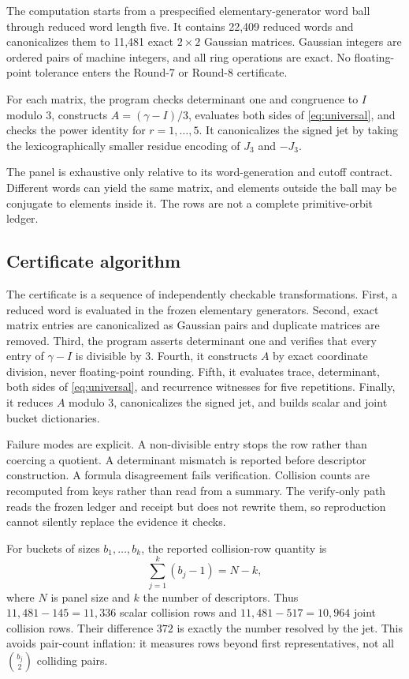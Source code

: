 \documentclass[11pt,a4paper]{article}
\theoremstyle{definition}
\theoremstyle{remark}
\begin{document}
The computation starts from a prespecified elementary-generator word ball through reduced word length five. It contains 22,409 reduced words and canonicalizes them to 11,481 exact \(2\times2\) Gaussian matrices. Gaussian integers are ordered pairs of machine integers, and all ring operations are exact. No floating-point tolerance enters the Round-7 or Round-8 certificate.

For each matrix, the program checks determinant one and congruence to \(I\) modulo \(3\), constructs \(A=(\gamma-I)/3\), evaluates both sides of \cref{eq:universal}, and checks the power identity for \(r=1,\ldots,5\). It canonicalizes the signed jet by taking the lexicographically smaller residue encoding of \(J_3\) and \(-J_3\).

The panel is exhaustive only relative to its word-generation and cutoff contract. Different words can yield the same matrix, and elements outside the ball may be conjugate to elements inside it. The rows are not a complete primitive-orbit ledger.

\subsection{Certificate algorithm}

The certificate is a sequence of independently checkable transformations. First, a reduced word is evaluated in the frozen elementary generators. Second, exact matrix entries are canonicalized as Gaussian pairs and duplicate matrices are removed. Third, the program asserts determinant one and verifies that every entry of \(\gamma-I\) is divisible by \(3\). Fourth, it constructs \(A\) by exact coordinate division, never floating-point rounding. Fifth, it evaluates trace, determinant, both sides of \cref{eq:universal}, and recurrence witnesses for five repetitions. Finally, it reduces \(A\) modulo \(3\), canonicalizes the signed jet, and builds scalar and joint bucket dictionaries.

Failure modes are explicit. A non-divisible entry stops the row rather than coercing a quotient. A determinant mismatch is reported before descriptor construction. A formula disagreement fails verification. Collision counts are recomputed from keys rather than read from a summary. The verify-only path reads the frozen ledger and receipt but does not rewrite them, so reproduction cannot silently replace the evidence it checks.

For buckets of sizes \(b_1,\ldots,b_k\), the reported collision-row quantity is
\[
 \sum_{j=1}^k(b_j-1)=N-k,
\]
where \(N\) is panel size and \(k\) the number of descriptors. Thus \(11{,}481-145=11{,}336\) scalar collision rows and \(11{,}481-517=10{,}964\) joint collision rows. Their difference \(372\) is exactly the number resolved by the jet. This avoids pair-count inflation: it measures rows beyond first representatives, not all \(\binom{b_j}{2}\) colliding pairs.
\end{document}
